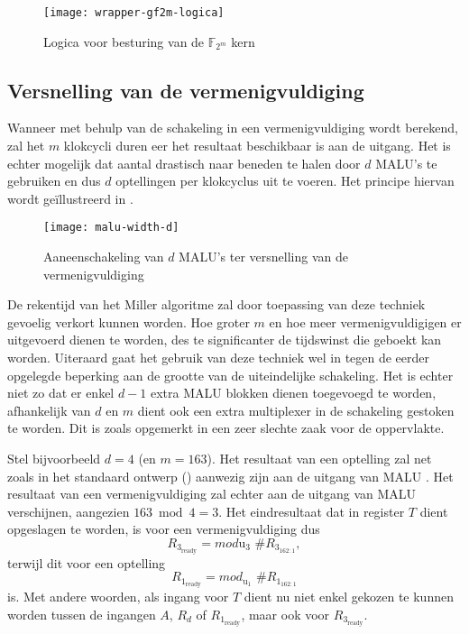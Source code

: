 \begin{figure}[h]
	\centering
		\texttt{[image: wrapper-gf2m-logica]}
		\caption{Logica voor besturing van de $\mathbb{F}_{2^m}$ kern\label{figuur-implementatie-wrapper-gf2m-logica}}
\end{figure}

\subsection{Versnelling van de vermenigvuldiging\label{subsectie-implementatie-gf2m-versnelling}}

Wanneer met behulp van de schakeling in  een vermenigvuldiging wordt berekend, zal het $m$ klokcycli duren eer het resultaat beschikbaar is aan de uitgang. Het is echter mogelijk dat aantal drastisch naar beneden te halen door $d$ MALU's te gebruiken en dus $d$ optellingen per klokcyclus uit te voeren. Het principe hiervan wordt ge\"illustreerd in .

\begin{figure}[h]
	\centering
		\texttt{[image: malu-width-d]}
		\caption{Aaneenschakeling van $d$ MALU's ter versnelling van de vermenigvuldiging\label{figuur-implementatie-wrapper-gf2m-d}}
\end{figure}

De rekentijd van het Miller algoritme zal door toepassing van deze techniek gevoelig verkort kunnen worden. Hoe groter $m$ en hoe meer vermenigvuldigigen er uitgevoerd dienen te worden, des te significanter de tijdswinst die geboekt kan worden. Uiteraard gaat het gebruik van deze techniek wel in tegen de eerder opgelegde beperking aan de grootte van de uiteindelijke schakeling. Het is echter niet zo dat er enkel $d - 1$ extra MALU blokken dienen toegevoegd te worden, afhankelijk van $d$ en $m$ dient ook een extra multiplexer in de schakeling gestoken te worden. Dit is zoals opgemerkt in  een zeer slechte zaak voor de  oppervlakte.

Stel bijvoorbeeld $d = 4$ (en $m = 	163$). Het resultaat van een optelling zal net zoals in het standaard ontwerp () aanwezig zijn aan de uitgang van MALU . Het resultaat van een vermenigvuldiging zal echter aan de uitgang van MALU  verschijnen, aangezien $163 \bmod 4 = 3$. Het eindresultaat dat in register $T$ dient opgeslagen te worden, is voor een vermenigvuldiging dus
\[R_{3_{\text{ready}}} = mod{\text{u}_3} \text{ \# } R_{3_{162:1}},\]
terwijl dit voor een optelling
\[R_{1_{\text{ready}}} = mod_{\text{u}_1} \text{ \# } R_{1_{162:1}}\]
is. Met andere woorden, als ingang voor $T$ dient nu niet enkel gekozen te kunnen worden tussen de ingangen $A$, $R_d$ of $R_{1_{\text{ready}}}$, maar ook voor $R_{3_{\text{ready}}}$.

